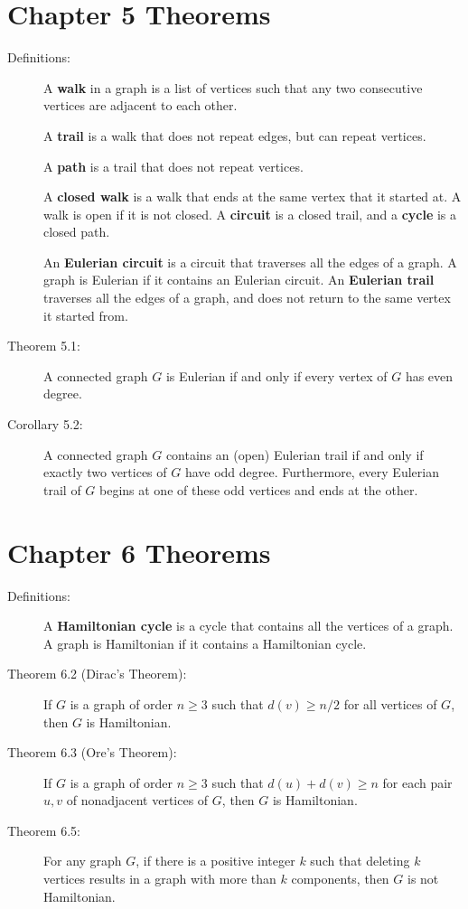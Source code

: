 \documentclass[9pt]{extarticle}
\title{}
\author{Avinash Iyer}
\date{}
\begin{document}
  \section*{Chapter 5 Theorems}%
  \begin{description}
    \item[Definitions:] A \textbf{walk} in a graph is a list of vertices such that any two consecutive vertices are adjacent to each other.

      A \textbf{trail} is a walk that does not repeat edges, but can repeat vertices.

      A \textbf{path} is a trail that does not repeat vertices.

      A \textbf{closed walk} is a walk that ends at the same vertex that it started at. A walk is open if it is not closed. A \textbf{circuit} is a closed trail, and a \textbf{cycle} is a closed path.

      An \textbf{Eulerian circuit} is a circuit that traverses all the edges of a graph. A graph is Eulerian if it contains an Eulerian circuit. An \textbf{Eulerian trail} traverses all the edges of a graph, and does not return to the same vertex it started from.
    \item[Theorem 5.1:] A connected graph $G$ is Eulerian if and only if every vertex of $G$ has even degree.
    \item[Corollary 5.2:] A connected graph $G$ contains an (open) Eulerian trail if and only if exactly two vertices of $G$ have odd degree. Furthermore, every Eulerian trail of $G$ begins at one of these odd vertices and ends at the other.
  \end{description}
  \section*{Chapter 6 Theorems}%
  \begin{description}
    \item[Definitions:] A \textbf{Hamiltonian cycle}  is a cycle that contains all the vertices of a graph. A graph is Hamiltonian if it contains a Hamiltonian cycle.
    \item[Theorem 6.2 (Dirac's Theorem):] If $G$ is a graph of order $n\geq 3$ such that $d(v) \geq n/2$ for all vertices of $G$, then $G$ is Hamiltonian.
    \item[Theorem 6.3 (Ore's Theorem):] If $G$ is a graph of order $n\geq 3$ such that $d(u) + d(v) \geq n$ for each pair $u,v$ of nonadjacent vertices of $G$, then $G$ is Hamiltonian.
    \item[Theorem 6.5:] For any graph $G$, if there is a positive integer $k$ such that deleting $k$ vertices results in a graph with more than $k$ components, then $G$ is not Hamiltonian.
  \end{description}
\end{document}

